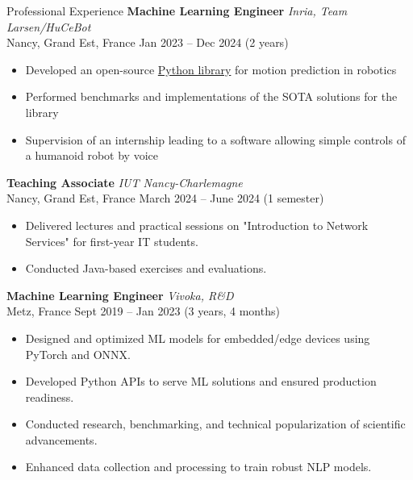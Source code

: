 \documentclass{resume} %
\begin{document}
 \begin{rSection}{Professional Experience}
\textbf{Machine Learning Engineer} \hfill \textit{Inria, Team Larsen/HuCeBot} \\
Nancy, Grand Est, France \hfill Jan 2023 -- Dec 2024 (2 years)
\begin{itemize}
    \item Developed an open-source \href{https://github.com/hucebot/prescyent}{Python library} for motion prediction in robotics
    \item Performed benchmarks and implementations of the SOTA solutions for the library
    \item Supervision of an internship leading to a software allowing simple controls of a humanoid robot by voice
\end{itemize}

\vspace{0.2cm}

\textbf{Teaching Associate} \hfill \textit{IUT Nancy-Charlemagne} \\
Nancy, Grand Est, France \hfill March 2024 -- June 2024  (1 semester)
\begin{itemize}
    \item Delivered lectures and practical sessions on "Introduction to Network Services" for first-year IT students.
    \item Conducted Java-based exercises and evaluations.
\end{itemize}

\vspace{0.2cm}

\textbf{Machine Learning Engineer} \hfill \textit{Vivoka, R\&D} \\
Metz, France \hfill Sept 2019 -- Jan 2023 (3 years, 4 months)
\begin{itemize}
    \item Designed and optimized ML models for embedded/edge devices using PyTorch and ONNX.
    \item Developed Python APIs to serve ML solutions and ensured production readiness.
    \item Conducted research, benchmarking, and technical popularization of scientific advancements.
    \item Enhanced data collection and processing to train robust NLP models.
\end{itemize}

\vspace{0.2cm}


\end{rSection}
\end{document}
